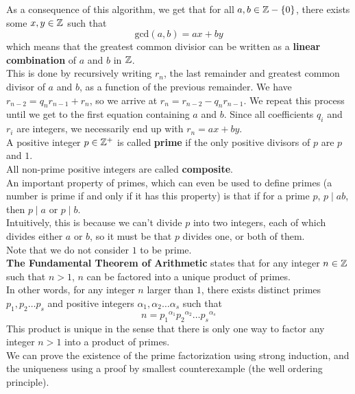 \documentclass[12pt]{article}
\begin{document}
    As a consequence of this algorithm,
    we get that for all $a, b \in \mathbb{Z} - \{0\}$,
    there exists some $x, y \in \mathbb{Z}$ such that
    \[ \text{gcd}(a, b) = ax + by \] 
    which means that the greatest common divisior can be written
    as a \textbf{linear combination} of $a$ and $b$ in $\mathbb{Z}$. \\
    This is done by recursively writing $r_n$,
    the last remainder and greatest common divisor of $a$ and $b$,
    as a function of the previous remainder.
    We have $ r_{n-2} = q_{n}r_{n-1} + r_{n}$,
    so we arrive at $r_{n} = r_{n-2} - q_{n}r_{n-1}$.
    We repeat this process until we get to the first equation
    containing $a$ and $b$.
    Since all coefficients $q_i$ and $r_i$ are integers,
    we necessarily end up with $r_n = ax + by$. \\

    A positive integer $p \in \mathbb{Z}^+$ is called \textbf{prime}
    if the only positive divisors of $p$ are $p$ and $1$. \\
    All non-prime positive integers are called \textbf{composite}. \\
    An important property of primes,
    which can even be used to define primes
    (a number is prime if and only if it has this property)
    is that if for a prime $p$, $p \mid ab$,
    then $p \mid a$ or $p \mid b$. \\
    Intuitively, this is because we can't divide $p$
    into two integers, each of which divides either $a$ or $b$,
    so it must be that $p$ divides one, or both of them. \\
    Note that we do not consider $1$ to be prime. \\

    \textbf{The Fundamental Theorem of Arithmetic}
    states that for any integer $n \in \mathbb{Z}$ such that $n > 1$,
    $n$ can be factored into a unique product of primes. \\
    In other words, for any integer $n$ larger than $1$,
    there exists distinct primes $p_1, p_2 \dots p_s$
    and positive integers $\alpha_1, \alpha_2 \dots \alpha_s$
    such that
    \[ n = {p_1}^{\alpha_1}{p_2}^{\alpha_2} \dots {p_s}^{\alpha_s} \]
    This product is unique in the sense that there is only
    one way to factor any integer $n > 1$ into a product of primes. \\
    We can prove the existence of the prime factorization
    using strong induction,
    and the uniqueness using a proof by smallest counterexample
    (the well ordering principle). \\
\end{document}

